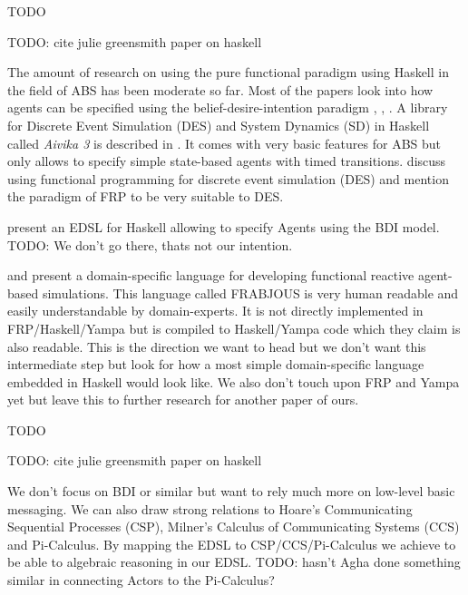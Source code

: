 \cite{klugl_amason:_2013} TODO

TODO: cite julie greensmith paper on haskell

The amount of research on using the pure functional paradigm using Haskell in the field of ABS has been moderate so far.
Most of the papers look into how agents can be specified using the belief-desire-intention paradigm \cite{de_jong_suitability_2014}, \cite{sulzmann_specifying_2007}, \cite{jankovic_functional_2007}.
A library for Discrete Event Simulation (DES) and System Dynamics (SD) in Haskell called \textit{Aivika 3} is described in \cite{sorokin_aivika_2015}. It comes with very basic features for ABS but only allows to specify simple state-based agents with timed transitions.
\cite{jankovic_functional_2007} discuss using functional programming for discrete event simulation (DES) and mention the paradigm of FRP to be very suitable to DES.

\cite{sulzmann_specifying_2007} present an EDSL for Haskell allowing to specify Agents using the BDI model. TODO: We don't go there, thats not our intention. 

\cite{schneider_towards_2012} and \cite{vendrov_frabjous:_2014} present a domain-specific language for developing functional reactive agent-based simulations. This language called FRABJOUS is very human readable and easily understandable by domain-experts. It is not directly implemented in FRP/Haskell/Yampa but is compiled to Haskell/Yampa code which they claim is also readable. This is the direction we want to head but we don't want this intermediate step but look for how a most simple domain-specific language embedded in Haskell would look like. We also don't touch upon FRP and Yampa yet but leave this to further research for another paper of ours.

\cite{klugl_amason:_2013} TODO

TODO: cite julie greensmith paper on haskell

We don't focus on BDI or similar but want to rely much more on low-level basic messaging. We can also draw strong relations to Hoare's Communicating Sequential Processes (CSP), Milner's Calculus of Communicating Systems (CCS) and Pi-Calculus. By mapping the EDSL to CSP/CCS/Pi-Calculus we achieve to be able to algebraic reasoning in our EDSL. TODO: hasn't Agha done something similar in connecting Actors to the Pi-Calculus?

